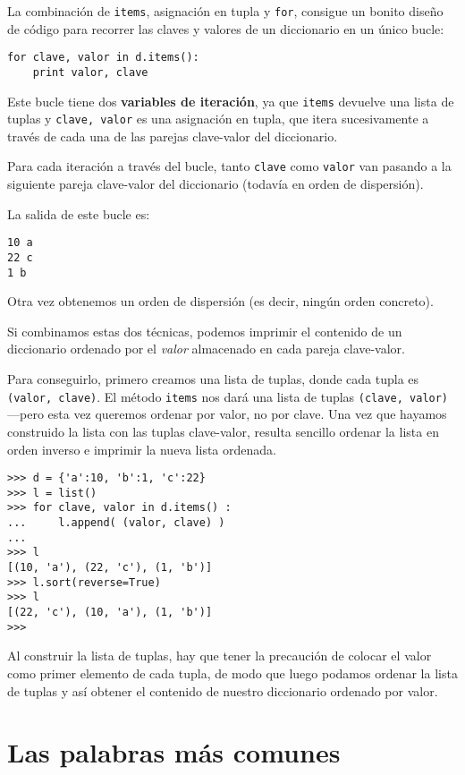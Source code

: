 
La combinación de {\tt items}, asignación en tupla y {\tt for},
consigue un bonito diseño de código para recorrer las claves y valores
de un diccionario en un único bucle:

\beforeverb
\begin{verbatim}
for clave, valor in d.items():
    print valor, clave
\end{verbatim}
\afterverb
%
Este bucle tiene dos {\bf variables de iteración}, ya que {\tt items} devuelve
una lista de tuplas y {\tt clave, valor} es una asignación en tupla,
que itera sucesivamente a través de cada una de las parejas clave-valor del
diccionario.

Para cada iteración a través del bucle, tanto {\tt clave} como {\tt valor} van
pasando a la siguiente pareja clave-valor del diccionario
(todavía en orden de dispersión).

La salida de este bucle es:

\beforeverb
\begin{verbatim}
10 a
22 c
1 b
\end{verbatim}
\afterverb
%
Otra vez obtenemos un orden de dispersión (es decir, ningún orden concreto).

Si combinamos estas dos técnicas, podemos imprimir el contenido
de un diccionario ordenado por el \emph{valor} almacenado en cada pareja
clave-valor.

Para conseguirlo, primero creamos una lista de tuplas, donde cada tupla es
{\tt (valor, clave)}. El método {\tt items} nos dará una lista de
tuplas {\tt (clave, valor)}---pero esta vez queremos ordenar por valor, no
por clave. Una vez que hayamos construido la lista con las tuplas clave-valor,
resulta sencillo ordenar la lista en orden inverso e imprimir la nueva lista ordenada.

\beforeverb
\begin{verbatim}
>>> d = {'a':10, 'b':1, 'c':22}
>>> l = list()
>>> for clave, valor in d.items() :
...     l.append( (valor, clave) )
... 
>>> l
[(10, 'a'), (22, 'c'), (1, 'b')]
>>> l.sort(reverse=True)
>>> l
[(22, 'c'), (10, 'a'), (1, 'b')]
>>> 
\end{verbatim}
\afterverb
%
Al construir la lista de tuplas, hay que tener la precaución de colocar el valor
como primer elemento de cada tupla, de modo que luego podamos ordenar la lista de tuplas
y así obtener el contenido de nuestro diccionario ordenado por valor.

\section{Las palabras más comunes}

